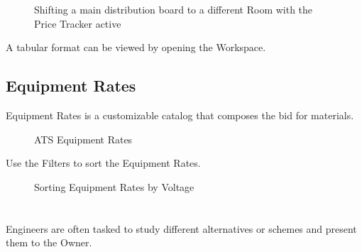 \documentclass[letterpaper,10pt,english]{sphinxmanual}
\begin{document}
\begin{figure}[H]
\centering
\capstart

\noindent{}
\caption{Shifting a main distribution board to a different Room with the Price Tracker active}\label{\detokenize{docs/userguide/pricingmodel/pricetracker/index-price_tracker:id3}}\end{figure}

A tabular format can be viewed by opening the {\hyperref[\detokenize{docs/userguide/pricingmodel/pricingreport/index-pricing_report:pricing-report}]{}} Workspace.


\subsection{Equipment Rates}
\label{\detokenize{docs/userguide/pricingmodel/equipmentrates/index-equipment_rates:equipment-rates}}\label{\detokenize{docs/userguide/pricingmodel/equipmentrates/index-equipment_rates:id1}}\label{\detokenize{docs/userguide/pricingmodel/equipmentrates/index-equipment_rates::doc}}
Equipment Rates is a customizable catalog that composes the bid for materials.

\begin{figure}[H]
\centering
\capstart

\noindent{}
\caption{ATS Equipment Rates}\label{\detokenize{docs/userguide/pricingmodel/equipmentrates/index-equipment_rates:id2}}\end{figure}

Use the Filters to sort the Equipment Rates.

\begin{figure}[H]
\centering
\capstart

\noindent{}
\caption{Sorting Equipment Rates by Voltage}\label{\detokenize{docs/userguide/pricingmodel/equipmentrates/index-equipment_rates:id3}}\end{figure}


\section{}
\label{\detokenize{docs/userguide/index-user_guide:project-management}}\label{\detokenize{docs/userguide/index-user_guide:id9}}
Engineers are often tasked to study different alternatives or schemes and present them to the Owner.
\end{document}
